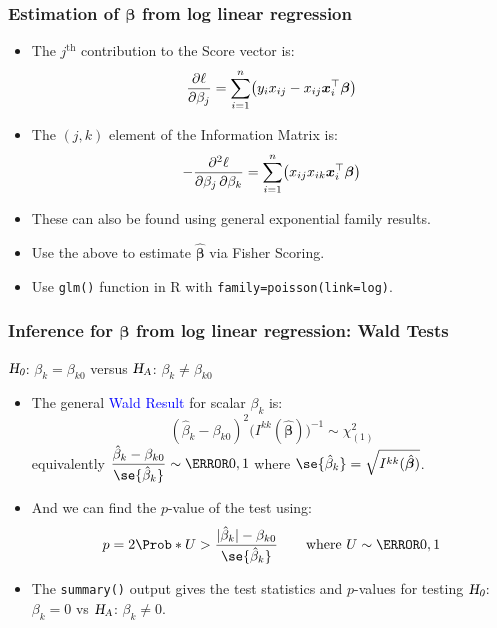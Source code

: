 \documentclass[oneside]{book}\usepackage[]{graphicx}\usepackage[svgnames]{xcolor}
\let\exp\relax%
\newcommand{\HN}{\textsl{H}_{\textsl{0}}}%
\newcommand{\HA}{\textsl{H}_{\textsl{A}}}%
\DeclarePairedDelimiter\abs{\lvert}{\rvert}
\providecommand{\Vector}[1]{\bm{#1}}%
\begin{document}
\subsubsection*{Estimation of $ \Vector{\beta} $ from log linear regression}
\begin{itemize}
      \item The $ j^{\text{th}} $ contribution to the Score vector is:
            \[ \pdv{\ell}{\beta_j}=\sum_{i=1}^{n}\bigl(y_i x_{ij}-x_{ij}\exp{\Vector{x}_i^\top \Vector{\beta}}\bigr) \]
      \item The $ (j,k) $ element of the Information Matrix is:
            \[ -\pdv{\ell}{\beta_j,\beta_k}=\sum_{i=1}^{n} \bigl(x_{ij}x_{ik}\exp{\Vector{x}_i^\top \Vector{\beta}}\bigr) \]
      \item These can also be found using general exponential family results.
      \item Use the above to estimate $ \hat{\Vector{\beta}} $ via Fisher Scoring.
      \item Use \texttt{glm()} function in R with \texttt{family=poisson(link=log)}.
\end{itemize}
\subsubsection*{Inference for $ \Vector{\beta} $ from log linear regression: Wald Tests}
\begin{center}
      $ \HN $: $ \beta_k=\beta_{k0} $ versus $ \HA $: $ \beta_k\ne \beta_{k0} $
\end{center}
\begin{itemize}
      \item The general \textcolor{Blue}{Wald Result} for scalar $ \beta_k $ is:
            \[ (\hat{\beta}_k-\beta_{k0})^2\bigl(I^{kk}(\hat{\Vector{\beta}})\bigr)^{-1} \sim \chi^2_{(1)} \]
            equivalently $ \dfrac{\hat{\beta}_k-\beta_{k0}}{\se{\hat{\beta}_k}}\sim \N{0,1} $ where $ \se{\hat{\beta}_k}=\sqrt{I^{kk}(\hat{\Vector{\beta}})} $.
      \item And we can find the $ p $-value of the test using:
            \[ p=2\Prob*{U>\frac{\abs{\hat{\beta}_k}-\beta_{k0}}{\se{\hat{\beta}_k}}}\qquad\text{where $U \sim \N{0,1}$} \]
      \item The \texttt{summary()} output gives the test statistics and $p$-values for testing $ \HN $: $ \beta_k=0 $ vs $ \HA $: $ \beta_k\ne 0 $.
\end{itemize}
\end{document}
